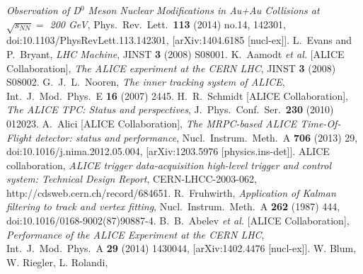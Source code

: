 \documentclass[b5paper,10pt,twoside,oldstyle,classica]{toptesi}
\begin{document}
\begin{thebibliography}{10}
  \textit{Observation of D$^0$ Meson Nuclear Modifications in Au+Au Collisions at $\sqrt{s_{NN}}=$ 200 GeV},
  Phys.\ Rev.\ Lett.\  {\bf 113} (2014) no.14,  142301,
  doi:10.1103/PhysRevLett.113.142301,
  [arXiv:1404.6185 [nucl-ex]].
  L.~Evans and P.~Bryant,
  \textit{LHC Machine},
  JINST {\bf 3} (2008) S08001.
  K.~Aamodt {\it et al.} [ALICE Collaboration],
  \textit{The ALICE experiment at the CERN LHC},
  JINST {\bf 3} (2008) S08002.
  G.~J.~L.~Nooren,
  \textit{The inner tracking system of ALICE},
  Int.\ J.\ Mod.\ Phys.\ E {\bf 16} (2007) 2445.
  H.~R.~Schmidt [ALICE Collaboration],
  \textit{The ALICE TPC: Status and perspectives},
  J.\ Phys.\ Conf.\ Ser.\  {\bf 230} (2010) 012023.
  A.~Alici [ALICE Collaboration],
  \textit{The MRPC-based ALICE Time-Of-Flight detector: status and performance},
  Nucl.\ Instrum.\ Meth.\ A {\bf 706} (2013) 29,
  doi:10.1016/j.nima.2012.05.004,
  [arXiv:1203.5976 [physics.ins-det]].
 ALICE collaboration, 
 \textit{ALICE trigger data-acquisition high-level trigger and control
 system: Technical Design Report},
 CERN-LHCC-2003-062,
 http://cdsweb.cern.ch/record/684651.
  R.~Fruhwirth,
  \textit{Application of Kalman filtering to track and vertex fitting},
  Nucl.\ Instrum.\ Meth.\ A {\bf 262} (1987) 444,
  doi:10.1016/0168-9002(87)90887-4.
  B.~B.~Abelev {\it et al.} [ALICE Collaboration],
  \textit{Performance of the ALICE Experiment at the CERN LHC},
  Int.\ J.\ Mod.\ Phys.\ A {\bf 29} (2014) 1430044,
  [arXiv:1402.4476 [nucl-ex]].
 W. Blum, W. Riegler, L. Rolandi,

\end{thebibliography}
\end{document}
